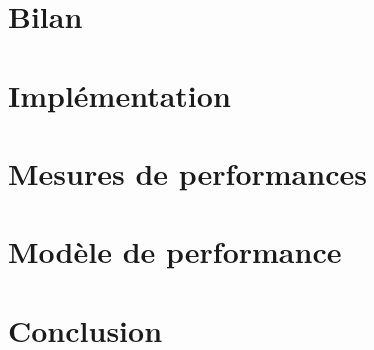 \documentclass[12pt,a4paper]{report}
\begin{document}
\chapter{Bilan} %

\chapter{Implémentation}\label{title-implementation}


\chapter{Mesures de performances}\label{title-mesures_perf}


\chapter{Modèle de performance}\label{title-modele_perf}


\chapter{Conclusion}\label{title-conclusion}



%

\end{document}

